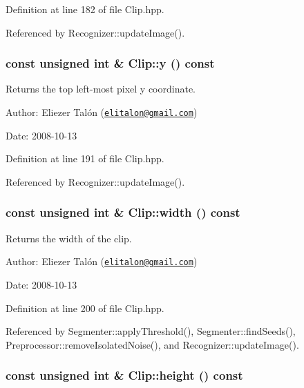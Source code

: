 Definition at line 182 of file Clip.hpp.

Referenced by Recognizer::updateImage().\hypertarget{class_clip_e06a2ad12ef2144a9d7d970b574c9c14}{
\subsubsection[y]{\setlength{\rightskip}{0pt plus 5cm}const unsigned int \& Clip::y () const}}
\label{class_clip_e06a2ad12ef2144a9d7d970b574c9c14}


Returns the top left-most pixel y coordinate. 

\begin{Desc}
\item[Author:]Eliezer Talón (\href{mailto:elitalon@gmail.com}{\tt elitalon@gmail.com}) \end{Desc}
\begin{Desc}
\item[Date:]2008-10-13 \end{Desc}


Definition at line 191 of file Clip.hpp.

Referenced by Recognizer::updateImage().\hypertarget{class_clip_88d1a47c0ec077e8c6680785509389b0}{
\subsubsection[width]{\setlength{\rightskip}{0pt plus 5cm}const unsigned int \& Clip::width () const}}
\label{class_clip_88d1a47c0ec077e8c6680785509389b0}


Returns the width of the clip. 

\begin{Desc}
\item[Author:]Eliezer Talón (\href{mailto:elitalon@gmail.com}{\tt elitalon@gmail.com}) \end{Desc}
\begin{Desc}
\item[Date:]2008-10-13 \end{Desc}


Definition at line 200 of file Clip.hpp.

Referenced by Segmenter::applyThreshold(), Segmenter::findSeeds(), Preprocessor::removeIsolatedNoise(), and Recognizer::updateImage().\hypertarget{class_clip_939908a8dde602d25335792cc0fd5d97}{
\subsubsection[height]{\setlength{\rightskip}{0pt plus 5cm}const unsigned int \& Clip::height () const}}
\label{class_clip_939908a8dde602d25335792cc0fd5d97}


